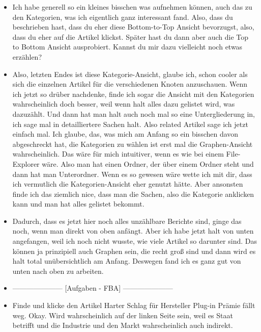 {\begin{itemize}[]
            \item {} Ich habe generell so ein kleines bisschen was aufnehmen können, auch das zu den Kategorien, was ich eigentlich ganz interessant fand.
                  Also, dass du beschrieben hast, dass du eher diese Bottom-to-Top Ansicht bevorzugst, also, dass du eher auf die Artikel klickst.
                  Später hast du dann aber auch die Top to Bottom Ansicht ausprobiert.
                  Kannst du mir dazu vielleicht noch etwas erzählen?
            \item {} Also, letzten Endes ist diese Kategorie-Ansicht, glaube ich, schon cooler als sich die einzelnen Artikel für die verschiedenen Knoten anzuschauen.
                  Wenn ich jetzt so drüber nachdenke, finde ich sogar die Ansicht mit den Kategorien wahrscheinlich doch besser, weil wenn halt alles dazu gelistet wird, was dazuzählt.
                  Und dann hat man halt auch noch mal so eine Untergliederung in, ich sage mal in detailliertere Sachen halt. Also related Artikel sage ich jetzt einfach mal.
                  Ich glaube, das, was mich am Anfang so ein bisschen davon abgeschreckt hat, die Kategorien zu wählen ist erst mal die Graphen-Ansicht wahrscheinlich.
                  Das wäre für mich intuitiver, wenn es wie bei einem File-Explorer wäre.
                  Also man hat einen Ordner, der über einem Ordner steht und dann hat man Unterordner.
                  Wenn es so gewesen wäre wette ich mit dir, dass ich vermutlich die Kategorien-Ansicht eher genutzt hätte.
                  Aber ansonsten finde ich das ziemlich nice, dass man die Sachen, also die Kategorie anklicken kann und man hat alles gelistet bekommt.
            \item {} Dadurch, dass es jetzt hier noch alles unzählbare Berichte sind, ginge das noch, wenn man direkt von oben anfängt.
                  Aber ich habe jetzt halt von unten angefangen, weil ich noch nicht wusste, wie viele Artikel so darunter sind.
                  Das können ja prinzipiell auch Graphen sein, die recht groß sind und dann wird es halt total unübersichtlich am Anfang.
                  Deswegen fand ich es ganz gut von unten nach oben zu arbeiten.
            \item {---------------------} [Aufgaben - FBA] {---------------------}
            \item {} Finde und klicke den Artikel \flqq Harter Schlag für Hersteller Plug-in Prämie fällt weg\frqq{}.
                  Okay. Wird wahrscheinlich auf der linken Seite sein, weil es Staat betrifft und die Industrie und den Markt wahrscheinlich auch indirekt.

\end{itemize}}
